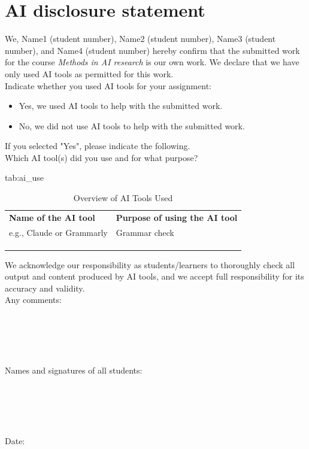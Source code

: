 \documentclass{midl} %
\begin{document}
\section{AI disclosure statement}
We, Name1 (student number), Name2 (student number), Name3 (student number), and Name4 (student number) hereby confirm that the submitted work for the course \textit{Methods in AI research} is our own work. We declare that we have only used AI tools as permitted for this work. \\

\noindent Indicate whether you used AI tools for your assignment:
\begin{itemize}
    \item Yes, we used AI tools to help with the submitted work.
    \item No, we did not use AI tools to help with the submitted work.
\end{itemize}

\noindent If you selected "Yes", please indicate the following.\\

\noindent Which AI tool(s) did you use and for what purpose?

\begin{table}[htbp]
\floatconts
  {tab:ai_use}%
  {\caption{Overview of AI Tools Used}}%
  {\begin{tabular}{ll}
  \bfseries Name of the AI tool & \bfseries Purpose of using the AI tool\\
  e.g., Claude or Grammarly & Grammar check \\
   & \\
   & \\
   & \\

  \end{tabular}}
\end{table}

\noindent We acknowledge our responsibility as students/learners to thoroughly check all output and content produced by AI tools, and we accept full responsibility for its accuracy and validity.\\

\noindent Any comments:\\\\\\\\\\\\


\noindent Names and signatures of all students: \\\\\\\\\\\\



\noindent Date: 
\end{document}
